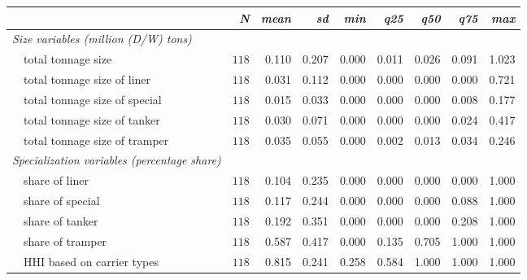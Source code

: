 \begin{tabular}{lrrrrrrrr}
\toprule
\multicolumn{1}{l}{\itshape }&\multicolumn{1}{r}{\itshape N}&\multicolumn{1}{r}{\itshape mean}&\multicolumn{1}{r}{\itshape sd}&\multicolumn{1}{r}{\itshape min}&\multicolumn{1}{r}{\itshape q25}&\multicolumn{1}{r}{\itshape q50}&\multicolumn{1}{r}{\itshape q75}&\multicolumn{1}{r}{\itshape max}\tabularnewline
\midrule
{\itshape Size variables (million (D/W) tons)}&&&&&&&&\tabularnewline
~~total tonnage size&$118$&0.110&0.207&0.000&0.011&0.026&0.091&1.023\tabularnewline
~~total tonnage size of liner&$118$&0.031&0.112&0.000&0.000&0.000&0.000&0.721\tabularnewline
~~total tonnage size of special&$118$&0.015&0.033&0.000&0.000&0.000&0.008&0.177\tabularnewline
~~total tonnage size of tanker&$118$&0.030&0.071&0.000&0.000&0.000&0.024&0.417\tabularnewline
~~total tonnage size of tramper&$118$&0.035&0.055&0.000&0.002&0.013&0.034&0.246\tabularnewline
\midrule
{\itshape Specialization variables (percentage share)}&&&&&&&&\tabularnewline
~~share of liner&$118$&0.104&0.235&0.000&0.000&0.000&0.000&1.000\tabularnewline
~~share of special&$118$&0.117&0.244&0.000&0.000&0.000&0.088&1.000\tabularnewline
~~share of tanker&$118$&0.192&0.351&0.000&0.000&0.000&0.208&1.000\tabularnewline
~~share of tramper&$118$&0.587&0.417&0.000&0.135&0.705&1.000&1.000\tabularnewline
~~HHI based on carrier types&$118$&0.815&0.241&0.258&0.584&1.000&1.000&1.000\tabularnewline
\bottomrule
\end{tabular}
